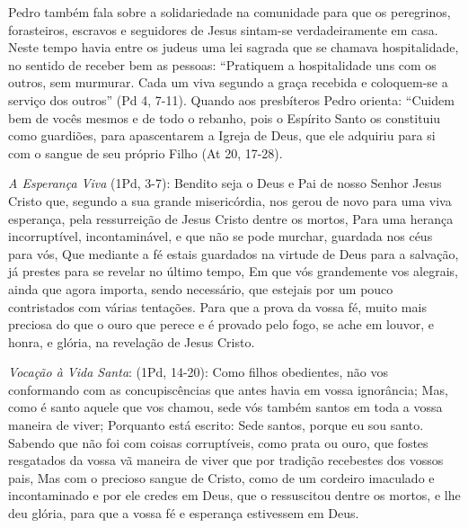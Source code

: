 \documentclass[
]{book}
\begin{document}
Pedro também fala sobre a solidariedade na comunidade para que os peregrinos, forasteiros, escravos e seguidores de Jesus sintam-se verdadeiramente em casa. Neste tempo havia entre os judeus uma lei sagrada que se chamava hospitalidade, no sentido de receber bem as pessoas: ``Pratiquem a hospitalidade uns com os outros, sem murmurar. Cada um viva segundo a graça recebida e coloquem-se a serviço dos outros'' (Pd 4, 7-11). Quando aos presbíteros Pedro orienta: ``Cuidem bem de vocês mesmos e de todo o rebanho, pois o Espírito Santo os constituiu como guardiões, para apascentarem a Igreja de Deus, que ele adquiriu para si com o sangue de seu próprio Filho (At 20, 17-28).

\emph{A Esperança Viva} (1Pd, 3-7): Bendito seja o Deus e Pai de nosso Senhor Jesus Cristo que, segundo a sua grande misericórdia, nos gerou de novo para uma viva esperança, pela ressurreição de Jesus Cristo dentre os mortos, Para uma herança incorruptível, incontaminável, e que não se pode murchar, guardada nos céus para vós, Que mediante a fé estais guardados na virtude de Deus para a salvação, já prestes para se revelar no último tempo, Em que vós grandemente vos alegrais, ainda que agora importa, sendo necessário, que estejais por um pouco contristados com várias tentações. Para que a prova da vossa fé, muito mais preciosa do que o ouro que perece e é provado pelo fogo, se ache em louvor, e honra, e glória, na revelação de Jesus Cristo.

\emph{Vocação à Vida Santa}: (1Pd, 14-20): Como filhos obedientes, não vos conformando com as concupiscências que antes havia em vossa ignorância; Mas, como é santo aquele que vos chamou, sede vós também santos em toda a vossa maneira de viver; Porquanto está escrito: Sede santos, porque eu sou santo. Sabendo que não foi com coisas corruptíveis, como prata ou ouro, que fostes resgatados da vossa vã maneira de viver que por tradição recebestes dos vossos pais, Mas com o precioso sangue de Cristo, como de um cordeiro imaculado e incontaminado e por ele credes em Deus, que o ressuscitou dentre os mortos, e lhe deu glória, para que a vossa fé e esperança estivessem em Deus.
\end{document}

